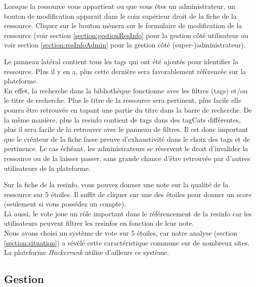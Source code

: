 Lorsque la ressource vous appartient ou que vous êtes un administrateur, un bouton de modification apparait dans le coin supérieur droit de la \gls{fiche} de la ressource. Cliquer sur le bouton mènera sur le formulaire de modification de la ressource (voir section \ref{section:gestionResInfo} pour la gestion côté utilisateur ou voir section \ref{section:resInfoAdmin} pour la gestion côté (super-)administrateur).\\


Le panneau latéral contient tous les \glspl{tag} qui ont été ajoutés pour identifier la ressource. Plus il y en a, plus cette dernière sera favorablement référencée sur la plateforme.\\

En effet, la recherche dans la bibliothèque fonctionne avec les filtres (\glspl{tag}) et/ou le titre de recherche. Plus le titre de la ressource sera pertinent, plus facile elle pourra être retrouvée en tapant une partie du titre dans la barre de recherche. 
De la même manière, plus la \gls{resinfo} contient de \glspl{tag} dans des \glspl{tagCat} différentes, plus il sera facile de la retrouver avec le panneau de filtres. Il est donc important que le créateur de la \gls{fiche} fasse preuve d'exhaustivité dans le choix des \glspl{tag} et de pertinence. Le cas échéant, les administrateurs se réservent le droit d'invalider la ressource ou de la laisser passer, sans grande chance d'être retrouvée par d'autres utilisateurs de la plateforme.

\label{section:systemeDeVote}

Sur la \gls{fiche} de la \gls{resinfo}, vous pouvez donner une note sur la qualité de la ressource sur 5 étoiles. Il suffit de cliquer sur une des étoiles pour donner un score (seulement si vous possédez un compte).\\

Là aussi, le vote joue un rôle important dans le référencement de la \gls{resinfo} car les utilisateurs peuvent filtrer les \glspl{resinfo} en fonction de leur note.\\

Nous avons choisi un système de vote sur 5 étoiles, car notre analyse (section \ref{section:situation}) a révélé cette caractéristique commune sur de nombreux sites. La plateforme \textit{Hackerrank} utilise d'ailleurs ce système.


\subsection{Gestion}

